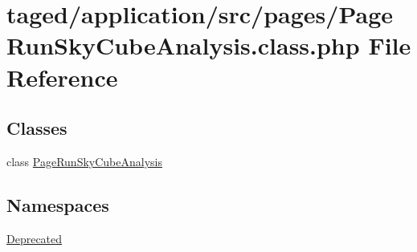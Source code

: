 \hypertarget{_page_run_sky_cube_analysis_8class_8php}{}\section{taged/application/src/pages/\+Page\+Run\+Sky\+Cube\+Analysis.class.\+php File Reference}
\label{_page_run_sky_cube_analysis_8class_8php}
\subsection*{Classes}
\begin{DoxyCompactItemize}
\item 
class \hyperlink{class_page_run_sky_cube_analysis}{Page\+Run\+Sky\+Cube\+Analysis}
\end{DoxyCompactItemize}
\subsection*{Namespaces}
\begin{DoxyCompactItemize}
\item 
 \hyperlink{namespace_deprecated}{Deprecated}
\end{DoxyCompactItemize}
